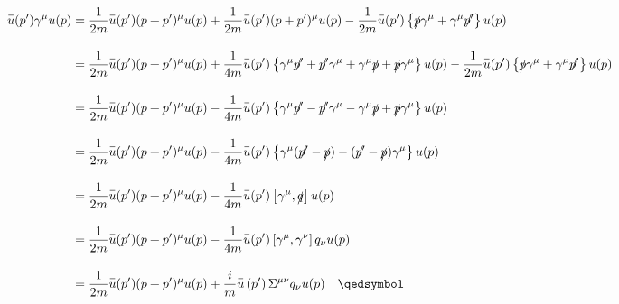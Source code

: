 \begin{solution}
\begin{align}
    \overbar{u}(p')\gamma^\mu u(p) &=   \frac{1}{2m}   \overbar{u}(p') (p+p')^\mu  u(p) + \frac{1}{2m}   \overbar{u}(p') (p+p')^\mu  u(p)  - \frac{1}{2m} \overbar{u}(p') \left\{ \slashed{p}\gamma^\mu + \gamma^\mu \slashed{p'} \right\}  u(p)  \nonumber \\[0.15in]
                                   &=   \frac{1}{2m}   \overbar{u}(p') (p+p')^\mu  u(p) + \frac{1}{4m} \overbar{u}(p') \left\{ \gamma^\mu \slashed{p'} + \slashed{p'}\gamma^\mu + \gamma^\mu \slashed{p} + \slashed{p}\gamma^\mu \right\} u(p) - \frac{1}{2m} \overbar{u}(p') \left\{ \slashed{p}\gamma^\mu + \gamma^\mu \slashed{p'} \right\}  u(p)  \nonumber \\[0.15in]
                                   &=   \frac{1}{2m}   \overbar{u}(p') (p+p')^\mu  u(p) - \frac{1}{4m} \overbar{u}(p') \left\{  \gamma^\mu \slashed{p'} - \slashed{p'}\gamma^\mu - \gamma^\mu \slashed{p} + \slashed{p}\gamma^\mu \right\} u(p)  \nonumber \\[0.15in]
                                   &=   \frac{1}{2m}   \overbar{u}(p') (p+p')^\mu  u(p) - \frac{1}{4m} \overbar{u}(p') \left\{ \gamma^\mu (\slashed{p'}-\slashed{p}) - (\slashed{p'}-\slashed{p}) \gamma^\mu \right\} u(p)  \nonumber \\[0.15in]
                                   &=   \frac{1}{2m}   \overbar{u}(p') (p+p')^\mu  u(p) - \frac{1}{4m} \overbar{u}(p') \left[  \gamma^\mu , \slashed{q} \right] u(p)  \nonumber \\[0.15in]
                                   &=   \frac{1}{2m}   \overbar{u}(p') (p+p')^\mu  u(p) - \frac{1}{4m} \overbar{u}(p') \left[  \gamma^\mu , \gamma^\nu \right] q_\nu u(p)  \nonumber \\[0.15in]
                                   &=   \frac{1}{2m}   \overbar{u}(p') (p+p')^\mu  u(p) + \frac{i}{m} \overbar{u}\left(p'\right) \Sigma^{\mu\nu} q_\nu u(p) \qed \nonumber
\end{align}
\end{solution}


